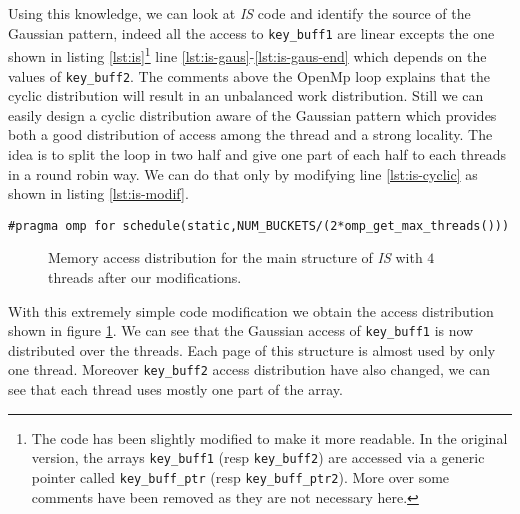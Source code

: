 

Using this knowledge, we can look at \emph{IS} code and identify the source of the
Gaussian pattern, indeed all the access to \texttt{key\_buff1} are linear
excepts the one shown in listing \ref{lst:is}\footnote{
    The code has been slightly modified to make it more readable. In the
    original version, the arrays \texttt{key\_buff1} (resp \texttt{key\_buff2})
    are accessed via a generic pointer called \texttt{key\_buff\_ptr} (resp
    \texttt{key\_buff\_ptr2}). More over some comments have been removed as
    they are not necessary here.
}  line \ref{lst:is-gaus}-\ref{lst:is-gaus-end} which depends on the values of
\texttt{key\_buff2}. The comments above the OpenMp loop explains that the
cyclic distribution will result in an unbalanced work distribution. Still we can easily design a cyclic
distribution aware of the Gaussian pattern which provides both a good
distribution of access among the thread and a strong locality. The idea is to
split the loop in two half and give one part of each half to each threads in a
round robin way. We can do that only by modifying line \ref{lst:is-cyclic} as
shown in listing \ref{lst:is-modif}.
\begin{lstlisting}[caption=One line optimization for \emph{IS}, label=lst:is-modif]
#pragma omp for schedule(static,NUM_BUCKETS/(2*omp_get_max_threads()))
\end{lstlisting}

\begin{figure}[htb]
    \centering


    \caption{Memory access distribution for the main structure of
        \emph{IS} with $4$ threads after our modifications.}
    \label{fig:is-behaviour-modif}
\end{figure}

With this extremely simple code modification we obtain the access distribution
shown in figure \ref{fig:is-behaviour-modif}. We can see that the Gaussian
access of \texttt{key\_buff1} is now distributed over the threads. Each page
of this structure is almost used by only one thread. Moreover
\texttt{key\_buff2} access distribution have also changed, we can see that
each thread uses mostly one part of the array.

